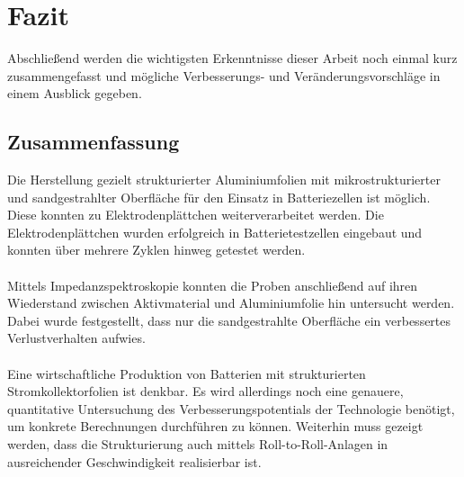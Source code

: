 \documentclass[a4paper, 11pt, headsepline,footsepline,twoside,abstract]{scrbook}
\begin{document}
\chapter{Fazit}
Abschließend werden die wichtigsten Erkenntnisse dieser Arbeit noch einmal kurz zusammengefasst und mögliche Verbesserungs- und Veränderungsvorschläge in einem Ausblick gegeben.
\section{Zusammenfassung}
Die Herstellung gezielt strukturierter Aluminiumfolien mit mikrostrukturierter und sandgestrahlter Oberfläche für den Einsatz in Batteriezellen ist möglich. Diese konnten zu Elektrodenplättchen weiterverarbeitet werden. Die Elektrodenplättchen wurden erfolgreich in Batterietestzellen eingebaut und konnten über mehrere Zyklen hinweg getestet werden.
\\\\
Mittels Impedanzspektroskopie konnten die Proben anschließend auf ihren Wiederstand zwischen Aktivmaterial und Aluminiumfolie hin untersucht werden. Dabei wurde festgestellt, dass nur die sandgestrahlte Oberfläche ein verbessertes Verlustverhalten aufwies. 
\\\\
Eine wirtschaftliche Produktion von Batterien mit strukturierten Stromkollektorfolien ist denkbar. Es wird allerdings noch eine genauere, quantitative Untersuchung des Verbesserungspotentials der Technologie benötigt, um konkrete Berechnungen durchführen zu können. Weiterhin muss gezeigt werden, dass die Strukturierung auch mittels Roll-to-Roll-Anlagen in ausreichender Geschwindigkeit realisierbar ist.
\end{document}
